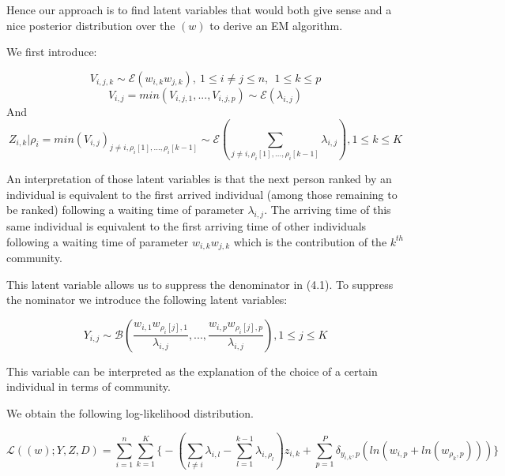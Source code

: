 \documentclass[12pt]{ociamthesis}  %
\begin{document}
	Hence our approach is to find latent variables that would both give sense and a nice posterior distribution over the $(w)$ to derive an EM algorithm.
	
	We first introduce:
	
	\begingroup
	\large
	\begin{equation}
	V_{i,j,k} \sim \mathcal{E}(w_{i,k}w_{j,k}), \ 1 \leq i \neq j \leq n, \ \ 1 \leq k \leq p
	\end{equation}
	\endgroup
	\begingroup
	\large
	\begin{equation}
	V_{i,j} = min(V_{i,j,1},...,V_{i,j,p}) \sim \mathcal{E}(\lambda_{i,j})
	\end{equation}
	\endgroup
	And
	\begingroup
	\large
	\begin{equation}
	Z_{i,k} | \rho_{i} = min(V_{i,j})_{j \neq i, \rho_{i}[1],...,\rho_{i}[k-1]} \sim \mathcal{E}(\sum_{j \neq i, \rho_{i}[1],...,\rho_{i}[k-1]}\lambda_{i,j}), 1 \leq k \leq K
	\end{equation}
	\endgroup
	
	An interpretation of those latent variables is that the next person ranked by an individual is equivalent to the first arrived individual (among those remaining to be ranked) following a waiting time of parameter $\lambda_{i,j}$. The arriving time of this same individual is equivalent to the first arriving time of other individuals following a waiting time of parameter $w_{i,k}w_{j,k}$ which is the contribution of the $k^{th}$ community.
	
	This latent variable allows us to suppress the denominator in (4.1). To suppress the nominator we introduce the following latent variables:
	
	\begingroup
	\large
	\begin{equation}
	Y_{i,j} \sim \mathcal{B}(\frac{w_{i,1}w_{\rho_{i}[j],1}}{\lambda_{i,j}}, ..., \frac{w_{i,p}w_{\rho_{i}[j],p}}{\lambda_{i,j}}), 1 \leq j \leq K
	\end{equation}
	\endgroup
	
	This variable can be interpreted as the explanation of the choice of a certain individual in terms of community.
	
	We obtain the following log-likelihood distribution.
	
	\begingroup
	\large
	\begin{equation}
	\mathcal{L}((w);Y,Z,D) = \sum_{i = 1}^{n} \sum_{k = 1}^{K} \bigg\{ -(\sum_{l \neq i} \lambda_{i,l} - \sum_{l = 1}^{k - 1} \lambda_{i,\rho_{l}})z_{i,k} + \sum_{p = 1}^{P} \delta_{y_{i,k}, p} (ln(w_{i,p} + ln(w_{\rho_{k},p}))) \bigg\}
	\end{equation}
	\endgroup
	
\end{document}
